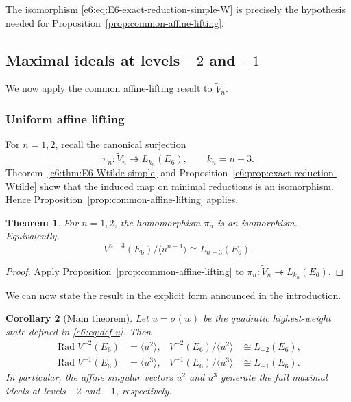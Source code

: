 \documentclass[11pt,reqno]{amsart}
\newtheorem{theorem}{Theorem}[section]
\newtheorem{corollary}[theorem]{Corollary}
\theoremstyle{definition}
\theoremstyle{remark}
\begin{document}
The isomorphism \eqref{e6:eq:E6-exact-reduction-simple-W} is precisely the
hypothesis needed for Proposition~\ref{prop:common-affine-lifting}.

\subsection{Maximal ideals at levels \texorpdfstring{$-2$}{-2} and
\texorpdfstring{$-1$}{-1}}


We now apply the common affine-lifting result to $\widetilde V_n$.

\subsubsection{Uniform affine lifting}


For $n=1,2$, recall the canonical surjection
\[
 \pi_n:\widetilde V_n\twoheadrightarrow L_{k_n}(E_6),
 \qquad k_n=n-3.
\]
Theorem~\ref{e6:thm:E6-Wtilde-simple} and
Proposition~\ref{e6:prop:exact-reduction-Wtilde} show that the induced map on
minimal reductions is an isomorphism.  Hence
Proposition~\ref{prop:common-affine-lifting} applies.

\begin{theorem}\label{e6:thm:E6-affine-quotients-simple}
For $n=1,2$, the homomorphism $\pi_n$ is an isomorphism.  Equivalently,
\begin{equation*}
  V^{n-3}(E_6)\big/\langle u^{n+1}\rangle
  \cong
  L_{n-3}(E_6).
\end{equation*}
\end{theorem}

\begin{proof}
Apply Proposition~\ref{prop:common-affine-lifting} to
$\pi_n:\widetilde V_n\twoheadrightarrow L_{k_n}(E_6)$.
\end{proof}

We can now state the result in the explicit form announced in the introduction.

\begin{corollary}[Main theorem]
Let $u=\sigma(w)$ be the quadratic highest-weight state defined in
\eqref{e6:eq:def-u}.  Then
\begin{align*}
  \operatorname{Rad}V^{-2}(E_6)
  &=\langle u^2\rangle,
  &
  V^{-2}(E_6)\big/\langle u^2\rangle
  &\cong L_{-2}(E_6),\\
  \operatorname{Rad}V^{-1}(E_6)
  &=\langle u^3\rangle,
  &
  V^{-1}(E_6)\big/\langle u^3\rangle
  &\cong L_{-1}(E_6).
\end{align*}
In particular, the affine singular vectors $u^2$ and $u^3$ generate the full
maximal ideals at levels $-2$ and $-1$, respectively.
\end{corollary}
\end{document}
